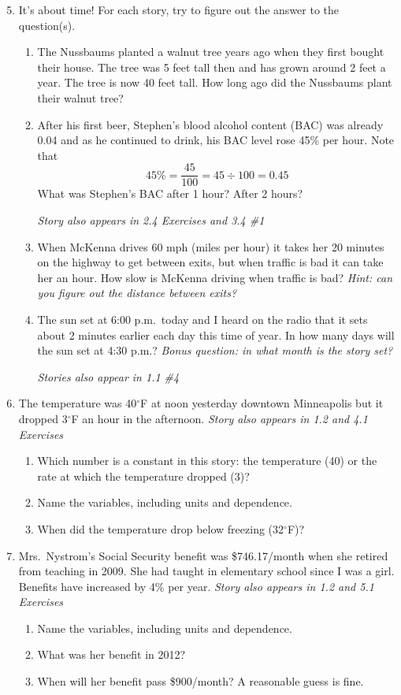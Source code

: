 \begin{enumerate} 
\setcounter{enumi}{4}

\item  It's about time!  For each story, try to figure out the answer to the question(s).
\begin{enumerate}
\item The Nussbaums planted a walnut tree years ago when they first bought their house.  The tree was 5 feet tall then and has grown around 2 feet a year. The tree is now 40 feet tall.  How long ago did the Nussbaums plant their walnut tree?
\item After his first beer, Stephen's blood alcohol content (BAC) was already 0.04 and as he continued to drink, his BAC level rose 45\% per hour.  Note that $$45\% = \frac{45}{100} = 45 \div 100 = 0.45$$  What was Stephen's BAC after 1 hour?  After 2 hours?

\hfill \emph{Story also appears in 2.4 Exercises and 3.4 \#1}
\item When McKenna drives 60 mph (miles per hour) it takes her 20 minutes on the highway to get between exits, but when traffic is bad it can take her an hour.  How slow is McKenna driving when traffic is bad?  \emph{Hint:  can you figure out the distance between exits?}
\item The sun set at 6:00 p.m.\ today and I heard on the radio that it sets about 2 minutes earlier each day this time of year.  In how many days will the sun set at 4:30 p.m.?
\emph{Bonus question:  in what month is the story set?}

 \hfill \emph{Stories also appear in 1.1 \#4}
\end{enumerate}  

\item The temperature was 40$^\circ$F at noon yesterday downtown Minneapolis but it dropped 3$^\circ$F an hour in the afternoon.   \hfill \emph{Story also appears in 1.2 and 4.1 Exercises}
 \begin{enumerate}
 \item Which number is a constant in this story: the temperature (40) or the rate at which the temperature dropped (3)?
\item Name the variables, including units and dependence. 
\item When did the temperature drop below freezing (32$^\circ$F)?
\end{enumerate}  

\item Mrs.\ Nystrom's Social Security benefit was \$746.17/month when she retired from teaching in 2009. She had taught in elementary school since I was a girl.   Benefits have increased by 4\% per year.   \hfill \emph{Story also appears in 1.2 and 5.1 Exercises} 
\begin{enumerate}
\item Name the variables, including units and dependence. 
\item What was her benefit in 2012?
\item When will her benefit pass \$900/month?  A reasonable guess is fine.  
\end{enumerate}  


\end{enumerate}
